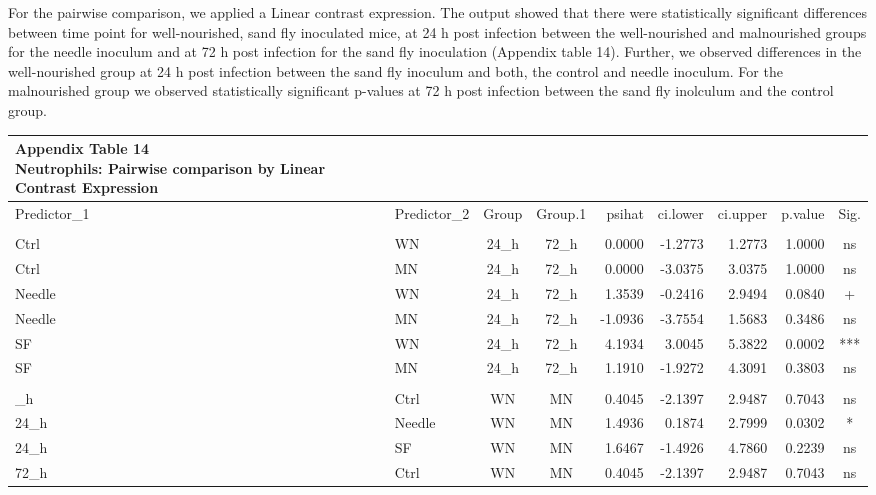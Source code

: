 \documentclass[
  12pt,
  letterpaper,
]{article}
\begin{document}
For the pairwise comparison, we applied a Linear contrast expression. The output showed that there were statistically significant differences between time point for well-nourished, sand fly inoculated mice, at 24 h post infection between the well-nourished and malnourished groups for the needle inoculum and at 72 h post infection for the sand fly inoculation (Appendix table 14). Further, we observed differences in the well-nourished group at 24 h post infection between the sand fly inoculum and both, the control and needle inoculum. For the malnourished group we observed statistically significant p-values at 72 h post infection between the sand fly inolculum and the control group.

\begingroup
\fontsize{12.0pt}{14.4pt}\selectfont
\begin{longtable}{llccrrrrc}
\caption*{
{\large \textbf{Appendix Table 14}} \\ 
{\small \textbf{Neutrophils: Pairwise comparison by Linear Contrast Expression}}
} \\ 
\toprule
Predictor\_1 & Predictor\_2 & {Group} & {Group.1} & {psihat} & {ci.lower} & {ci.upper} & {p.value} & {Sig.} \\ 
\midrule\addlinespace[2.5pt]
\multicolumn{9}{l}{Predictor: Time\_point} \\[2.5pt] 
\midrule\addlinespace[2.5pt]
Ctrl & WN & 24\_h & 72\_h & 0.0000 & -1.2773 & 1.2773 & 1.0000 & ns \\ 
Ctrl & MN & 24\_h & 72\_h & 0.0000 & -3.0375 & 3.0375 & 1.0000 & ns \\ 
Needle & WN & 24\_h & 72\_h & 1.3539 & -0.2416 & 2.9494 & 0.0840 & + \\ 
Needle & MN & 24\_h & 72\_h & -1.0936 & -3.7554 & 1.5683 & 0.3486 & ns \\ 
SF & WN & 24\_h & 72\_h & 4.1934 & 3.0045 & 5.3822 & 0.0002 & *** \\ 
SF & MN & 24\_h & 72\_h & 1.1910 & -1.9272 & 4.3091 & 0.3803 & ns \\ 
\midrule\addlinespace[2.5pt]
\multicolumn{9}{l}{Predictor: Diet} \\[2.5pt] 
\midrule\addlinespace[2.5pt]
24\_h & Ctrl & WN & MN & 0.4045 & -2.1397 & 2.9487 & 0.7043 & ns \\ 
24\_h & Needle & WN & MN & 1.4936 & 0.1874 & 2.7999 & 0.0302 & * \\ 
24\_h & SF & WN & MN & 1.6467 & -1.4926 & 4.7860 & 0.2239 & ns \\ 
72\_h & Ctrl & WN & MN & 0.4045 & -2.1397 & 2.9487 & 0.7043 & ns \\ 

\end{longtable}
\end{document}
